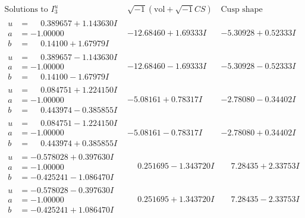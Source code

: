 \documentclass[1p]{elsarticle_modified}
\theoremstyle{definition}
\newcommand{\I}{\sqrt{-1}}
\begin{document}
$$\begin{array}{c|c|c}  
\text{Solutions to }I^u_{3}& \I (\text{vol} + \sqrt{-1}CS) & \text{Cusp shape}\\
 \hline 
\begin{aligned}
u &= \phantom{-}0.389657 + 1.143630 I \\
a &= -1.00000\phantom{ +0.000000I} \\
b &= \phantom{-}0.14100 + 1.67979 I\end{aligned}
 & -12.68460 + 1.69333 I & -5.30928 + 0.52333 I \\ \hline\begin{aligned}
u &= \phantom{-}0.389657 - 1.143630 I \\
a &= -1.00000\phantom{ +0.000000I} \\
b &= \phantom{-}0.14100 - 1.67979 I\end{aligned}
 & -12.68460 - 1.69333 I & -5.30928 - 0.52333 I \\ \hline\begin{aligned}
u &= \phantom{-}0.084751 + 1.224150 I \\
a &= -1.00000\phantom{ +0.000000I} \\
b &= \phantom{-}0.443974 - 0.385855 I\end{aligned}
 & -5.08161 + 0.78317 I & -2.78080 - 0.34402 I \\ \hline\begin{aligned}
u &= \phantom{-}0.084751 - 1.224150 I \\
a &= -1.00000\phantom{ +0.000000I} \\
b &= \phantom{-}0.443974 + 0.385855 I\end{aligned}
 & -5.08161 - 0.78317 I & -2.78080 + 0.34402 I \\ \hline\begin{aligned}
u &= -0.578028 + 0.397630 I \\
a &= -1.00000\phantom{ +0.000000I} \\
b &= -0.425241 - 1.086470 I\end{aligned}
 & \phantom{-}0.251695 - 1.343720 I & \phantom{-}7.28435 + 2.33753 I \\ \hline\begin{aligned}
u &= -0.578028 - 0.397630 I \\
a &= -1.00000\phantom{ +0.000000I} \\
b &= -0.425241 + 1.086470 I\end{aligned}
 & \phantom{-}0.251695 + 1.343720 I & \phantom{-}7.28435 - 2.33753 I \\ \hline\begin{aligned}

\end{aligned}
\end{array}$$
\end{document}
